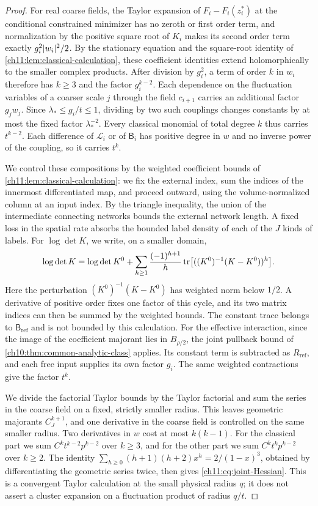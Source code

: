 \begin{proof}
For real coarse fields, the Taylor expansion of $F_i-F_i(z_i^*)$ at the conditional constrained minimizer has no zeroth or first order term, and normalization by the positive square root of $K_i$ makes its second order term exactly $g_i^2\lvert w_i\rvert^2/2$. By the stationary equation and the square-root identity of \cref{ch11:lem:classical-calculation}, these coefficient identities extend holomorphically to the smaller complex products. After division by $g_i^2$, a term of order $k$ in $w_i$ therefore has $k\ge3$ and the factor $g_i^{k-2}$. Each dependence on the fluctuation variables of a coarser scale $j$ through the field $c_{i+1}$ carries an additional factor $g_jw_j$. Since $\lambda_*\le g_i/t\le1$, dividing by two such couplings changes constants by at most the fixed factor $\lambda_*^{-2}$. Every classical monomial of total degree $k$ thus carries $t^{k-2}$. Each difference of $\mathcal L_i$ or of $\mathsf B_i$ has positive degree in $w$ and no inverse power of the coupling, so it carries $t^k$.

We control these compositions by the weighted coefficient bounds of \cref{ch11:lem:classical-calculation}: we fix the external index, sum the indices of the innermost differentiated map, and proceed outward, using the volume-normalized column at an input index. By the triangle inequality, the union of the intermediate connecting networks bounds the external network length. A fixed loss in the spatial rate absorbs the bounded label density of each of the $J$ kinds of labels. For $\log\det K$, we write, on a smaller domain,
\[
 \log\det K=\log\det K^0+\sum_{h\ge1}\frac{(-1)^{h+1}}h\operatorname{tr}\bigl[((K^0)^{-1}(K-K^0))^h\bigr].
\]
Here the perturbation $(K^0)^{-1}(K-K^0)$ has weighted norm below $1/2$. A derivative of positive order fixes one factor of this cycle, and its two matrix indices can then be summed by the weighted bounds. The constant trace belongs to $\mathsf B_{\mathrm{ref}}$ and is not bounded by this calculation. For the effective interaction, since the image of the coefficient majorant lies in $B_{\rho/2}$, the joint pullback bound of \cref{ch10:thm:common-analytic-class} applies. Its constant term is subtracted as $R_{\mathrm{ref}}$, and each free input supplies its own factor $g_i$. The same weighted contractions give the factor $t^k$.

We divide the factorial Taylor bounds by the Taylor factorial and sum the series in the coarse field on a fixed, strictly smaller radius. This leaves geometric majorants $C_J^{k+1}$, and one derivative in the coarse field is controlled on the same smaller radius. Two derivatives in $w$ cost at most $k(k-1)$. For the classical part we sum $C^kt^{k-2}p^{k-2}$ over $k\ge3$, and for the other part we sum $C^kt^kp^{k-2}$ over $k\ge2$. The identity $\sum_{h\ge0}(h+1)(h+2)x^h=2/(1-x)^3$, obtained by differentiating the geometric series twice, then gives \eqref{ch11:eq:joint-Hessian}. This is a convergent Taylor calculation at the small physical radius $q$; it does not assert a cluster expansion on a fluctuation product of radius $q/t$.
\end{proof}

